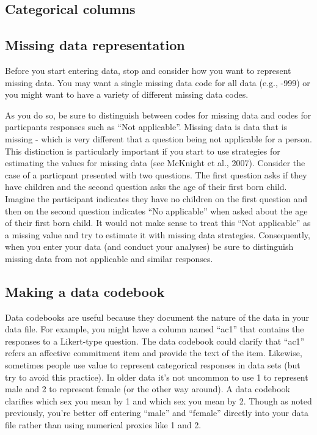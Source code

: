 \documentclass[
]{krantz}
\begin{document}
\hypertarget{categorical-columns}{%
\subsection{Categorical columns}\label{categorical-columns}}

\hypertarget{missing-data-representation}{%
\subsection{Missing data representation}\label{missing-data-representation}}

Before you start entering data, stop and consider how you want to represent missing data. You may want a single missing data code for all data (e.g., -999) or you might want to have a variety of different missing data codes.

As you do so, be sure to distinguish between codes for missing data and codes for particpants responses such as ``Not applicable''. Missing data is data that is missing - which is very different that a question being not applicable for a person. This distinction is particularly important if you start to use strategies for estimating the values for missing data (see McKnight et al., 2007). Consider the case of a particpant presented with two questions. The first question asks if they have children and the second question asks the age of their first born child. Imagine the participant indicates they have no children on the first question and then on the second question indicates ``No applicable'' when asked about the age of their first born child. It would not make sense to treat this ``Not applicable'' as a missing value and try to estimate it with missing data strategies. Consequently, when you enter your data (and conduct your analyses) be sure to distinguish missing data from not applicable and similar responses.

\hypertarget{making-a-data-codebook}{%
\subsection{Making a data codebook}\label{making-a-data-codebook}}

Data codebooks are useful because they document the nature of the data in your data file. For example, you might have a column named ``ac1'' that contains the responses to a Likert-type question. The data codebook could clarify that ``ac1'' refers an affective commitment item and provide the text of the item. Likewise, sometimes people use value to represent categorical responses in data sets (but try to avoid this practice). In older data it's not uncommon to use 1 to represent male and 2 to represent female (or the other way around). A data codebook clarifies which sex you mean by 1 and which sex you mean by 2. Though as noted previously, you're better off entering ``male'' and ``female'' directly into your data file rather than using numerical proxies like 1 and 2.
\end{document}
